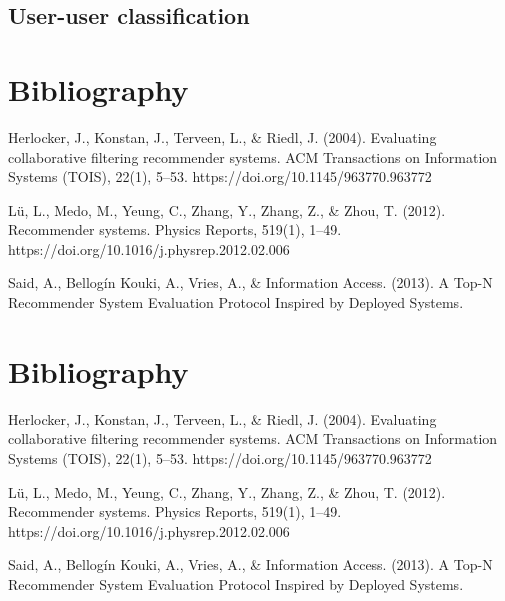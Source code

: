 \documentclass[11pt]{article}
\begin{document}
\subsection{User-user classification}




\section{Bibliography}
Herlocker, J., Konstan, J., Terveen, L., & Riedl, J. (2004). Evaluating collaborative filtering recommender systems. ACM Transactions on Information Systems (TOIS), 22(1), 5–53. https://doi.org/10.1145/963770.963772

Lü, L., Medo, M., Yeung, C., Zhang, Y., Zhang, Z., & Zhou, T. (2012). Recommender systems. Physics Reports, 519(1), 1–49. https://doi.org/10.1016/j.physrep.2012.02.006

Said, A., Bellogín Kouki, A., Vries, A., & Information Access. (2013). A Top-N Recommender System Evaluation Protocol Inspired by Deployed Systems.
\section{Bibliography}
Herlocker, J., Konstan, J., Terveen, L., & Riedl, J. (2004). Evaluating collaborative filtering recommender systems. ACM Transactions on Information Systems (TOIS), 22(1), 5–53. https://doi.org/10.1145/963770.963772

Lü, L., Medo, M., Yeung, C., Zhang, Y., Zhang, Z., & Zhou, T. (2012). Recommender systems. Physics Reports, 519(1), 1–49. https://doi.org/10.1016/j.physrep.2012.02.006

Said, A., Bellogín Kouki, A., Vries, A., & Information Access. (2013). A Top-N Recommender System Evaluation Protocol Inspired by Deployed Systems.
\end{document}
